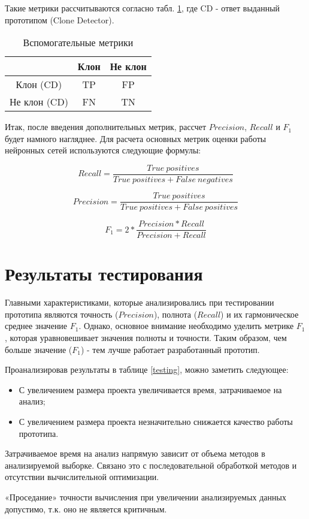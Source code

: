 Такие метрики рассчитываются согласно табл. \ref{truepos}, где CD - ответ выданный прототипом (Clone Detector).

\begin{table}[H]
\centering
\captionsetup{skip=5pt}
\caption{Вспомогательные метрики}
\label{truepos}
\begin{tabular}{c|c|c|}
\cline{2-3}
                                   & Клон & Не клон \\ \hline
\multicolumn{1}{|c|}{Клон (CD)}    & TP   & FP      \\ \hline
\multicolumn{1}{|c|}{Не клон (CD)} & FN   & TN      \\ \hline
\end{tabular}
\end{table}

Итак, после введения дополнительных метрик, рассчет \(Precision\), \(Recall\) и \(F_1\) будет намного нагляднее. Для расчета основных метрик оценки работы нейронных сетей используются следующие формулы:

\begin{equation}
\label{eq:recall}
Recall = \frac{True\ positives}{True\ positives + False\ negatives}
\end{equation}

\begin{equation}
\label{eq:precision}
Precision = \frac{True\ positives}{True\ positives + False\ positives}
\end{equation}

\begin{equation}
\label{eq:f1}
F_1 = 2*\frac{Precision * Recall}{Precision + Recall}
\end{equation}

\section{Результаты тестирования}

Главными характеристиками, которые анализировались при тестировании прототипа являются точность (\(Precision\)), полнота (\(Recall\)) и их гармоническое среднее значение \(F_1\). Однако, основное внимание необходимо уделить метрике \(F_1\), которая уравновешивает значения полноты и точности. Таким образом, чем больше значение (\(F_1\)) - тем лучше работает разработанный прототип.

Проанализировав результаты в таблице \ref{testing}, можно заметить следующее:
\begin{itemize}
\setlength\itemsep{0mm}
\item С увеличением размера проекта увеличивается время, затрачиваемое на анализ;
\item С увеличением размера проекта незначительно снижается качество работы прототипа.
\end{itemize}

Затрачиваемое время на анализ напрямую зависит от объема методов в анализируемой выборке. Связано это с последовательной обработкой методов и отсутствии вычислительной оптимизации.

«Проседание» точности вычисления при увеличении анализируемых данных допустимо, т.к. оно не является критичным.
